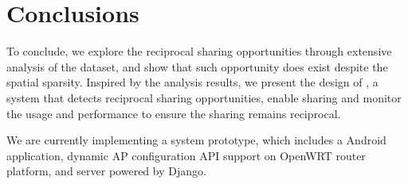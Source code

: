 \section{Conclusions}
\label{sec:conclusion}

To conclude, we explore the reciprocal sharing opportunities through extensive
analysis of the \PhoneLab{} \wifi{} dataset, and show that such opportunity does
exist despite the spatial sparsity. Inspired by the analysis results, we present
the design of \wisefi{}, a system that detects reciprocal sharing opportunities,
enable \wifi{} sharing and monitor the \wifi{} usage and performance to ensure
the sharing remains reciprocal.

We are currently implementing a \wisefi{} system prototype, which includes a
\wisefi{} Android application, dynamic AP configuration API support on OpenWRT
router platform, and \wisefi{} server powered by Django.
